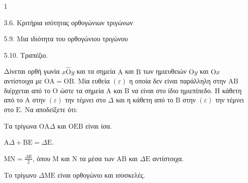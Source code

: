 \begin{ylh}{1}
    \item 3.6. Κριτήρια ισότητας ορθογώνιων τριγώνων
    \item 5.9. Μια ιδιότητα του ορθογώνιου τριγώνου
    \item 5.10. Τραπέζιο.
\end{ylh}
Δίνεται ορθή γωνία $x\hat{\mathrm{O}}y$ και τα σημεία $\mathrm{A}$ και $\mathrm{B}$ των ημιευθειών $\mathrm{O}y$ και $\mathrm{O}x$ αντίστοιχα με $\mathrm{O}\mathrm{A} = \mathrm{O}\mathrm{B}$. Μία ευθεία $(\varepsilon)$ η οποία δεν είναι παράλληλη στην $\mathrm{A}\mathrm{B}$ διέρχεται από το $\mathrm{O}$ ώστε τα σημεία $\mathrm{A}$ και $\mathrm{B}$ να είναι στο ίδιο ημιεπίπεδο. Η κάθετη από το $\mathrm{A}$ στην $(\varepsilon)$ την τέμνει στο $\Delta$ και η κάθετη από το $\mathrm{B}$ στην $(\varepsilon)$ την τέμνει στο $\mathrm{E}$.
Να αποδείξετε ότι:
\begin{alist}
    \item Τα τρίγωνα $\mathrm{O}\mathrm{A}\Delta$ και $\mathrm{O}\mathrm{E}\mathrm{B}$ είναι ίσα. 
    \item $\mathrm{A}\Delta + \mathrm{B}\mathrm{E} = \Delta\mathrm{E}$. 
    \item $\mathrm{M}\mathrm{N} = \frac{\Delta\mathrm{E}}{2}$, όπου $\mathrm{M}$ και $\mathrm{N}$ τα μέσα των $\mathrm{A}\mathrm{B}$ και $\Delta\mathrm{E}$ αντίστοιχα. 
    \item Το τρίγωνο $\Delta\mathrm{M}\mathrm{E}$ είναι ορθογώνιο και ισοσκελές. 
\end{alist}
